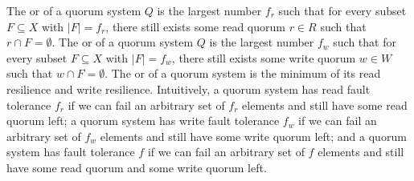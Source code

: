 The  or  of a quorum
system $Q$ is the largest number $f_r$ such that for every subset $F \subseteq
X$ with $|F| = f_r$, there still exists some read quorum $r \in R$ such that $r
\cap F = \emptyset$.
%
The  or  of a quorum
system $Q$ is the largest number $f_w$ such that for every subset $F \subseteq
X$ with $|F| = f_w$, there still exists some write quorum $w \in W$ such that $w
\cap F = \emptyset$.
%
The  or  of a quorum system is the
minimum of its read resilience and write resilience. Intuitively, a quorum
system has read fault tolerance $f_r$ if we can fail an arbitrary set of $f_r$
elements and still have some read quorum left; a quorum system has write fault
tolerance $f_w$ if we can fail an arbitrary set of $f_w$ elements and still
have some write quorum left; and a quorum system has fault tolerance $f$ if we
can fail an arbitrary set of $f$ elements and still have some read quorum and
some write quorum left.
